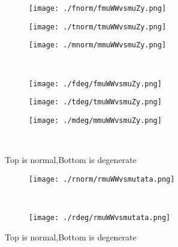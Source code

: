 \documentclass[aps,floats,floatfix,nofootinbib]{revtex4-1}
\begin{document}
\begin{center}
\begin{figure}
\begin{subfigure}{0.3\textwidth}
\texttt{[image: ./fnorm/fmuWWvsmuZy.png]}
\label{}
\end{subfigure}
\begin{subfigure}{0.3\textwidth}
\texttt{[image: ./tnorm/tmuWWvsmuZy.png]}
\label{}
\end{subfigure}
\begin{subfigure}{0.3\textwidth}
\texttt{[image: ./mnorm/mmuWWvsmuZy.png]}
\label{}
\end{subfigure}\\
\begin{subfigure}{0.3\textwidth}
\texttt{[image: ./fdeg/fmuWWvsmuZy.png]}
\label{}
\end{subfigure}
\begin{subfigure}{0.3\textwidth}
\texttt{[image: ./tdeg/tmuWWvsmuZy.png]}
\label{}
\end{subfigure}
\begin{subfigure}{0.3\textwidth}
\texttt{[image: ./mdeg/mmuWWvsmuZy.png]}
\label{}
\end{subfigure}\\
\caption{Top is normal,Bottom is degenerate}
\end{figure}
\end{center}

\begin{center}
\begin{figure}
\begin{subfigure}{1.0\textwidth}
\texttt{[image: ./rnorm/rmuWWvsmutata.png]}
\label{}
\end{subfigure}\\
\begin{subfigure}{1.0\textwidth}
\texttt{[image: ./rdeg/rmuWWvsmutata.png]}
\label{}
\end{subfigure}
\caption{Top is normal,Bottom is degenerate}
\end{figure}
\end{center}
\end{document}
